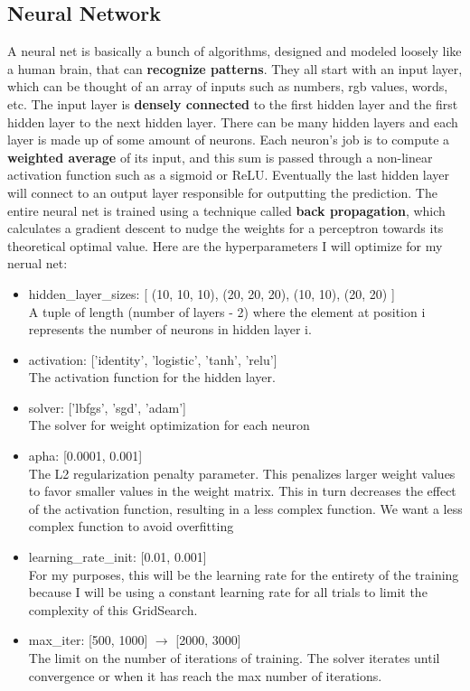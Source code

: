 \documentclass[12pt]{article}
\begin{document}
\subsection{Neural Network}
A neural net is basically a bunch of algorithms, designed and modeled loosely like a human brain, that can \textbf{recognize patterns}. They all start with an input layer, which can be thought of an array of inputs such as numbers, rgb values, words, etc. The input layer is \textbf{densely connected} to the first hidden layer and the first hidden layer to the next hidden layer. There can be many hidden layers and each layer is made up of some amount of neurons. Each neuron's job is to compute a \textbf{weighted average} of its input, and this sum is passed through a non-linear activation function such as a sigmoid or ReLU. Eventually the last hidden layer will connect to an output layer responsible for outputting the prediction. The entire neural net is trained using a technique called \textbf{back propagation}, which calculates a gradient descent to nudge the weights for a perceptron towards its theoretical optimal value. Here are the hyperparameters I will optimize for my nerual net:
\begin{itemize}
    \item hidden\_layer\_sizes: [ (10, 10, 10), (20, 20, 20), (10, 10), (20, 20) ]
    \\ A tuple of length (number of layers - 2) where the element at position i represents the number of neurons in hidden layer i.
    \item activation: ['identity', 'logistic', 'tanh', 'relu']
    \\ The activation function for the hidden layer.
    \item solver: ['lbfgs', 'sgd', 'adam']
    \\ The solver for weight optimization for each neuron
    \item apha: [0.0001, 0.001]
    \\ The L2 regularization penalty parameter. This penalizes larger weight values to favor smaller values in the weight matrix. This in turn decreases the effect of the activation function, resulting in a less complex function. We want a less complex function to avoid overfitting
    \item learning\_rate\_init: [0.01, 0.001]
    \\ For my purposes, this will be the learning rate for the entirety of the training because I will be using a constant learning rate for all trials to limit the complexity of this GridSearch.
    \item max\_iter: [500, 1000] $\rightarrow$ [2000, 3000]
    \\ The limit on the number of iterations of training. The solver iterates until convergence or when it has reach the max number of iterations.
\end{itemize}
\end{document}

